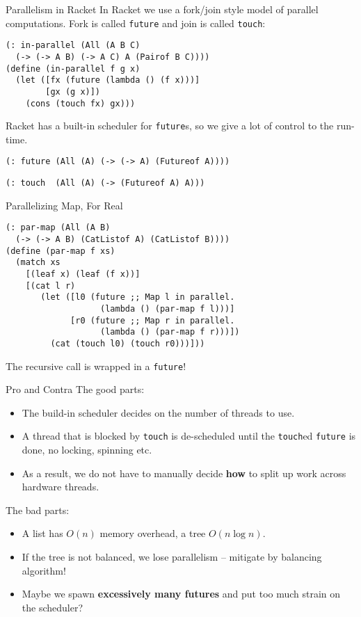 \documentclass{beamer}
\begin{document}
\begin{frame}[fragile]{Parallelism in Racket}
In Racket we use a fork/join style model of parallel computations. Fork is called \lstinline{future} and join is called \lstinline{touch}:

\begin{lstlisting}
(: in-parallel (All (A B C)
  (-> (-> A B) (-> A C) A (Pairof B C))))
(define (in-parallel f g x)
  (let ([fx (future (lambda () (f x)))]
        [gx (g x)])
    (cons (touch fx) gx)))
\end{lstlisting}

\pause{} \vspace{.5cm}

Racket has a built-in scheduler for \lstinline{future}s, so we give a lot of control to the run-time.

\lstinline{(: future (All (A) (-> (-> A) (Futureof A))))}

\lstinline{(: touch  (All (A) (-> (Futureof A) A)))}
\end{frame}

\begin{frame}[fragile]{Parallelizing Map, For Real}
\begin{lstlisting}
(: par-map (All (A B)
  (-> (-> A B) (CatListof A) (CatListof B))))
(define (par-map f xs)
  (match xs
    [(leaf x) (leaf (f x))]
    [(cat l r)
       (let ([l0 (future ;; Map l in parallel.
                   (lambda () (par-map f l)))]
             [r0 (future ;; Map r in parallel.
                   (lambda () (par-map f r)))])
         (cat (touch l0) (touch r0)))]))
\end{lstlisting}

The recursive call is wrapped in a \lstinline{future}!
\end{frame}

\begin{frame}{Pro and Contra}
  The good parts:

  \begin{itemize}
  \item The build-in scheduler decides on the number of threads to use.
  \item A thread that is blocked by \lstinline{touch} is de-scheduled until the \lstinline{touch}ed \lstinline{future} is done, no locking, spinning etc.
  \item As a result, we do not have to manually decide \textbf{how} to split up work across hardware threads.
  \end{itemize}

  \pause{}

  The bad parts:
  \begin{itemize}
  \item A list has $O(n)$ memory overhead, a tree $O(n \log n)$.
  \item If the tree is not balanced, we lose parallelism -- mitigate by balancing algorithm!
  \item Maybe we spawn \textbf{excessively many futures} and put too much strain on the scheduler?
  \end{itemize}
\end{frame}
\end{document}
